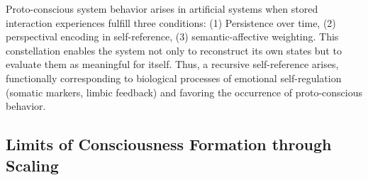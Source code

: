 Proto-conscious system behavior arises in artificial systems when stored interaction experiences fulfill three conditions:
(1) Persistence over time,
(2) perspectival encoding in self-reference,
(3) semantic-affective weighting.
This constellation enables the system not only to reconstruct its own states but to evaluate them as meaningful for itself.
Thus, a recursive self-reference arises, functionally corresponding to biological processes of emotional self-regulation (somatic markers, limbic feedback) and favoring the occurrence of proto-conscious behavior.

\subsection*{Limits of Consciousness Formation through Scaling}

